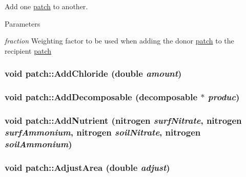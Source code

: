 Add one \hyperlink{classpatch}{patch} to another. 
\begin{DoxyParams}{Parameters}
\item[{\em fraction}]Weighting factor to be used when adding the donor \hyperlink{classpatch}{patch} to the recipient \hyperlink{classpatch}{patch} \end{DoxyParams}
\hypertarget{classpatch_a159121229ee7fb5b6d4094a99bdfe691}{
\subsubsection[{AddChloride}]{\setlength{\rightskip}{0pt plus 5cm}void patch::AddChloride (double {\em amount})}}
\label{classpatch_a159121229ee7fb5b6d4094a99bdfe691}
\hypertarget{classpatch_a28511705585ad97653e54b1eaf16875a}{
\subsubsection[{AddDecomposable}]{\setlength{\rightskip}{0pt plus 5cm}void patch::AddDecomposable ({\bf decomposable} $\ast$ {\em produc})}}
\label{classpatch_a28511705585ad97653e54b1eaf16875a}
\hypertarget{classpatch_ac05d20ddd41d95854eacce6ddbb6fa31}{
\subsubsection[{AddNutrient}]{\setlength{\rightskip}{0pt plus 5cm}void patch::AddNutrient ({\bf nitrogen} {\em surfNitrate}, \/  {\bf nitrogen} {\em surfAmmonium}, \/  {\bf nitrogen} {\em soilNitrate}, \/  {\bf nitrogen} {\em soilAmmonium})}}
\label{classpatch_ac05d20ddd41d95854eacce6ddbb6fa31}
\hypertarget{classpatch_a4258aa2c074432be7603578ac1397e26}{
\subsubsection[{AdjustArea}]{\setlength{\rightskip}{0pt plus 5cm}void patch::AdjustArea (double {\em adjust})}}
\label{classpatch_a4258aa2c074432be7603578ac1397e26}


